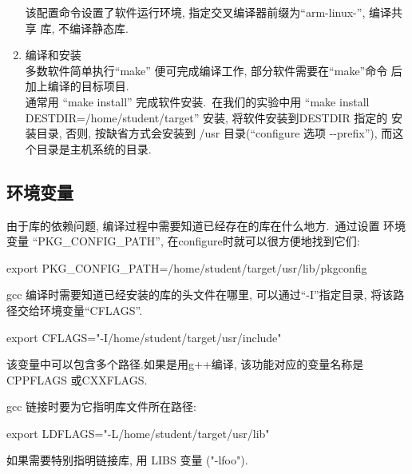 \begin{enumerate}
    该配置命令设置了软件运行环境, 指定交叉编译器前缀为``arm-linux-'', 编译共享
库, 不编译静态库.

  \item 编译和安装\\
      多数软件简单执行``make'' 便可完成编译工作, 部分软件需要在``make''命令
      后加上编译的目标项目.\\
      通常用 ``make install'' 完成软件安装.~在我们的实验中用 ``make install 
      DESTDIR=/home/student/target'' 安装, 将软件安装到DESTDIR 指定的
      安装目录, 否则, 按缺省方式会安装到 /usr 目录(``configure 选项
      -{}-prefix''), 而这个目录是主机系统的目录.

\end{enumerate}

\subsection{环境变量}
    由于库的依赖问题, 编译过程中需要知道已经存在的库在什么地方.~通过设置
环境变量 ``PKG\_CONFIG\_PATH'', 在configure时就可以很方便地找到它们:

    export PKG\_CONFIG\_PATH=/home/student/target/usr/lib/pkgconfig

    gcc 编译时需要知道已经安装的库的头文件在哪里, 可以通过``-I''指定目录,
将该路径交给环境变量``CFLAGS''.

    export CFLAGS="-I/home/student/target/usr/include"

    该变量中可以包含多个路径.如果是用g++编译, 该功能对应的变量名称是CPPFLAGS
或CXXFLAGS.

    gcc 链接时要为它指明库文件所在路径: 

    export LDFLAGS="-L/home/student/target/usr/lib"

    如果需要特别指明链接库, 用 LIBS 变量 ("-lfoo").
